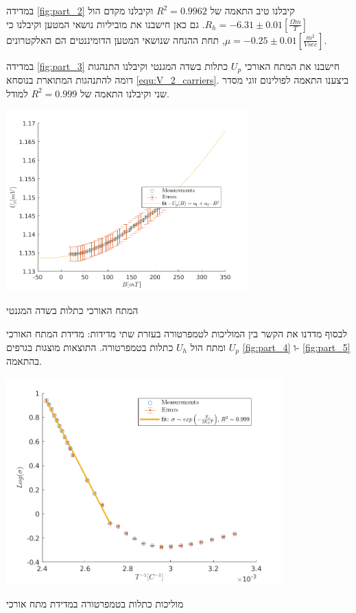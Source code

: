 \documentclass{article}
\begin{document}
במדידה 
\ref{fig:part_2}
קיבלנו טיב התאמה של
$R^2 = 0.9962$
וקיבלנו מקדם הול
$R_h = -6.31 \pm 0.01 [\frac{\Omega m}{T}]$.
גם כאן חישבנו את מוביליות נושאי המטען וקיבלנו כי 
$\mu = -0.25 \pm 0.01 [\frac{m^2}{V sec}]$,
תחת ההנחה שנושאי המטען הדומיננטים הם האלקטרונים.

במדידה
\ref{fig:part_3}
חישבנו את המתח האורכי
$U_p$
כתלות בשדה המגנטי וקיבלנו התנהגות דומה להתנהגות המתוארת בנוסחא
\ref{equ:V_2_carriers}.
ביצענו התאמה לפולינום זוגי מסדר שני וקיבלנו התאמה של
$R^2 = 0.999$
למודל.




\begin{graph}[H]
    \centering
    \includegraphics[width=0.7\textwidth]{part3 - B-squared relation.png}
    \caption{המתח האורכי כתלות בשדה המגנטי}
    \label{fig:part_3}
\end{graph}

לבסוף מדדנו את הקשר בין המוליכות לטמפרטורה בעזרת שתי מדידות: מדידת המתח האורכי
$U_p$
ומתח הול
$U_h$
כתלות בטמפרטורה.
התוצאות מוצגות בגרפים
\ref{fig:part_4}
ו-
\ref{fig:part_5}
בהתאמה.

\begin{graph}[H]
    \centering
    \includegraphics[width=0.8\textwidth]{part4 - E_g.png}
    \caption{
    מוליכות כתלות בטמפרטורה במדידת מתח אורכי
    }
    \label{fig:part_4}
\end{graph}
\end{document}
